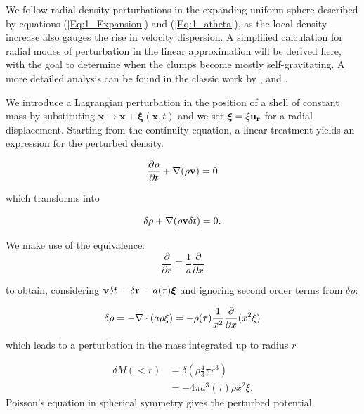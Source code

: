 We follow radial density perturbations in the expanding uniform sphere described by equations (\ref{Eq:1_Expansion}) and (\ref{Eq:1_atheta}), as the local density increase also gauges the rise in velocity dispersion. A simplified calculation for radial modes of perturbation in the linear approximation will be derived here, with the goal to determine when the clumps become mostly self-gravitating. A more detailed analysis can be found in the classic work by \cite{Friedman1978}, \cite{Peebles1980} and \cite{Aarseth1988} .

We introduce a Lagrangian perturbation in the position of a shell of constant mass by substituting $\mathbf{x} \rightarrow \mathbf{x} + \boldsymbol\xi(\mathbf{x},t)$ and we set $\boldsymbol\xi = \xi \bold{u_r}$ for a radial displacement. Starting from the continuity equation, a linear treatment yields an expression for the perturbed density.

\begin{equation}
\frac{\partial \rho}{\partial t} + \nabla(\rho \bold{v}) = 0 
\end{equation}

which transforms into

\begin{equation}
\delta \rho + \nabla (\rho \bold{v} \delta t) = 0.
\end{equation}

We make use of the equivalence:
\begin{equation}
\label{Eq:1_derivequiv}
\frac{\partial}{\partial r} \equiv \frac{1}{a} \frac{\partial}{\partial x}
\end{equation}

to obtain, considering $ \bold{v} \delta t = \delta \bold{r} = a(\tau) \boldsymbol\xi$ and ignoring second order terms from $\delta \rho$:

\begin{equation} 
\label{Eq:1_DeltaRho} 
\delta\rho = - \mathbf{\nabla}\cdot (a\rho\mathbf{\xi}) =  - \rho(\tau) \frac{1}{x^2}\frac{\partial}{\partial x} ( x^2\xi ) 
\end{equation}

which leads to a perturbation in  the mass integrated up to  radius $r$ 

\begin{align}
\delta M(<r) &= \delta \left( \rho \frac{4}{3} \pi r^3 \right)\\
    &= - 4\pi a^3(\tau) \rho x^2 \xi . 
\end{align}
Poisson's equation in spherical symmetry gives the perturbed potential 

